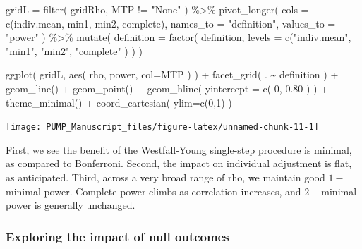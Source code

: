 \documentclass[
]{article}
\newenvironment{Shaded}{\begin{snugshade}}{\end{snugshade}}
\newcommand{\AttributeTok}[1]{\textcolor[rgb]{0.77,0.63,0.00}{#1}}
\newcommand{\DecValTok}[1]{\textcolor[rgb]{0.00,0.00,0.81}{#1}}
\newcommand{\FloatTok}[1]{\textcolor[rgb]{0.00,0.00,0.81}{#1}}
\newcommand{\FunctionTok}[1]{\textcolor[rgb]{0.00,0.00,0.00}{#1}}
\newcommand{\NormalTok}[1]{#1}
\newcommand{\OtherTok}[1]{\textcolor[rgb]{0.56,0.35,0.01}{#1}}
\newcommand{\SpecialCharTok}[1]{\textcolor[rgb]{0.00,0.00,0.00}{#1}}
\newcommand{\StringTok}[1]{\textcolor[rgb]{0.31,0.60,0.02}{#1}}
\begin{document}
\begin{Shaded}
\begin{Highlighting}[]
\NormalTok{gridL }\OtherTok{=} \FunctionTok{filter}\NormalTok{( gridRho, MTP }\SpecialCharTok{!=} \StringTok{"None"}\NormalTok{ ) }\SpecialCharTok{\%\textgreater{}\%}
  \FunctionTok{pivot\_longer}\NormalTok{( }\AttributeTok{cols =} \FunctionTok{c}\NormalTok{(indiv.mean, min1, min2, complete),}
                \AttributeTok{names\_to =} \StringTok{"definition"}\NormalTok{, }\AttributeTok{values\_to =} \StringTok{"power"}\NormalTok{ ) }\SpecialCharTok{\%\textgreater{}\%}
  \FunctionTok{mutate}\NormalTok{( }\AttributeTok{definition =} \FunctionTok{factor}\NormalTok{( definition,}
                            \AttributeTok{levels =} \FunctionTok{c}\NormalTok{(}\StringTok{"indiv.mean"}\NormalTok{, }\StringTok{"min1"}\NormalTok{, }\StringTok{"min2"}\NormalTok{, }\StringTok{"complete"}\NormalTok{ ) ) )}

\FunctionTok{ggplot}\NormalTok{( gridL, }\FunctionTok{aes}\NormalTok{( rho, power, }\AttributeTok{col=}\NormalTok{MTP ) ) }\SpecialCharTok{+}
  \FunctionTok{facet\_grid}\NormalTok{( . }\SpecialCharTok{\textasciitilde{}}\NormalTok{ definition ) }\SpecialCharTok{+}
  \FunctionTok{geom\_line}\NormalTok{() }\SpecialCharTok{+} \FunctionTok{geom\_point}\NormalTok{() }\SpecialCharTok{+}
  \FunctionTok{geom\_hline}\NormalTok{( }\AttributeTok{yintercept =} \FunctionTok{c}\NormalTok{( }\DecValTok{0}\NormalTok{, }\FloatTok{0.80}\NormalTok{ ) ) }\SpecialCharTok{+} 
  \FunctionTok{theme\_minimal}\NormalTok{() }\SpecialCharTok{+}
  \FunctionTok{coord\_cartesian}\NormalTok{( }\AttributeTok{ylim=}\FunctionTok{c}\NormalTok{(}\DecValTok{0}\NormalTok{,}\DecValTok{1}\NormalTok{) )}
\end{Highlighting}
\end{Shaded}

\begin{center}\texttt{[image: PUMP\_Manuscript\_files/figure-latex/unnamed-chunk-11-1]} \end{center}

First, we see the benefit of the Westfall-Young single-step procedure is
minimal, as compared to Bonferroni. Second, the impact on individual
adjustment is flat, as anticipated. Third, across a very broad range of
rho, we maintain good \(1-\)minimal power. Complete power climbs as
correlation increases, and \(2-\)minimal power is generally unchanged.

\subsubsection{Exploring the impact of null outcomes}
\end{document}
